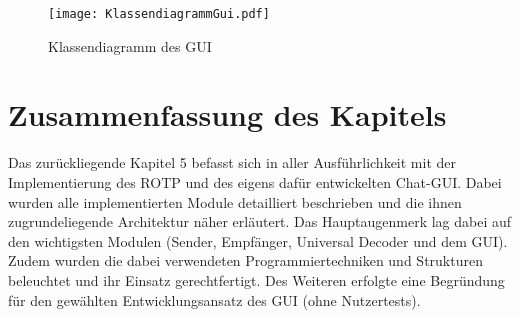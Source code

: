 \begin{figure}[H]
	\centering
	\texttt{[image: KlassendiagrammGui.pdf]}
	\caption{Klassendiagramm des GUI}
	\label{fig:KlassendiagrammGui}
\end{figure}

\section{Zusammenfassung des Kapitels}

Das zur{\"u}ckliegende Kapitel 5 befasst sich in aller Ausf{\"u}hrlichkeit mit
der Implementierung des \gls{ROTP} und des eigens daf{\"u}r entwickelten
Chat-GUI.
Dabei wurden alle implementierten Module detailliert beschrieben und die ihnen
zugrundeliegende Architektur n{\"a}her erl{\"a}utert. Das Hauptaugenmerk lag
dabei auf den wichtigsten Modulen (Sender, Empf{\"a}nger, Universal Decoder
und dem \gls{GUI}). Zudem wurden die dabei verwendeten Programmiertechniken und
Strukturen beleuchtet und ihr Einsatz gerechtfertigt. Des Weiteren erfolgte eine
Begr{\"u}ndung f{\"u}r den gew{\"a}hlten Entwicklungsansatz des GUI (ohne
Nutzertests).
